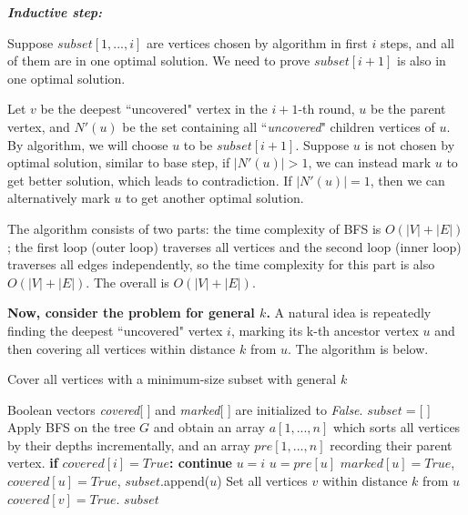 \documentclass{oxmathproblems}
\begin{document}
\begin{questions}
\begin{Solution}
\textbf{\textit{Inductive step:}}

Suppose $subset[1, ..., i]$ are vertices chosen by algorithm in first $i$ steps, and all of them are in one optimal solution. We need to prove $subset[i+1]$ is also in one optimal solution.

Let $v$ be the deepest ``uncovered" vertex in the $i+1$-th round, $u$ be the parent vertex, and $N'(u)$ be the set containing all ``\textit{uncovered}" children vertices of $u$. By algorithm, we will choose $u$ to be $subset[i+1]$. Suppose $u$ is not chosen by optimal solution, similar to base step, if $|N'(u)|>1$, we can instead mark $u$ to get better solution, which leads to contradiction. If $|N'(u)|=1$, then we can alternatively mark $u$ to get another optimal solution. 

\vspace{0.5cm}
The algorithm consists of two parts: the time complexity of BFS is $O(|V|+|E|)$; the first loop (outer loop) traverses all vertices and the second loop (inner loop) traverses all edges independently, so the time complexity for this part is also $O(|V|+|E|)$. The overall is $O(|V|+|E|)$.

\vspace{0.5cm}
\textbf{Now, consider the problem for general $k$.} A natural idea is repeatedly finding the deepest ``uncovered" vertex $i$, marking its k-th ancestor vertex $u$ and then covering all vertices within distance $k$ from $u$. The algorithm is below.

\begin{algorithm}[H]
    \caption{Cover all vertices with a minimum-size subset with general $k$}
    \label{}
    \begin{algorithmic}[1]
        \State Boolean vectors \textit{covered}[ ] and \textit{marked}[ ] are initialized to \textit{False}.
        \State $subset=$[ ]
        \State Apply BFS on the tree $G$ and obtain an array $a[1,...,n]$ which sorts all vertices by their depths incrementally, and an array $pre[1,...,n]$ recording their parent vertex.
        \State \textbf{if} $covered[i]=True$\textbf{: continue}
        \State $u=i$
                \State $u=pre[u]$
            \EndFor
            \State $marked[u]=True$, $covered[u]=True$, $subset$.append($u$)
            \State Set all vertices $v$ within distance $k$ from $u$ $covered[v]=True$.
        \EndFor
        \State \Return $subset$
    \end{algorithmic}
\end{algorithm}


\end{Solution}
\end{questions}
\end{document}
